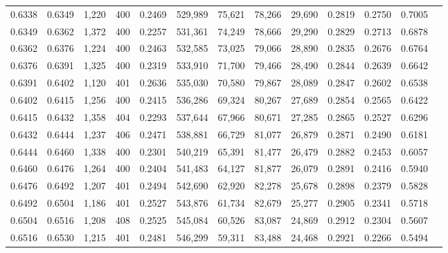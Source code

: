 \begin{tabular}{rrrrrrrrrrrrr}
0.6338 & 0.6349 &  1,220 & 400 &                                     0.2469 & 529,989 &  75,621 &  78,266 &  29,690 & 0.2819 & 0.2750 & 0.7005 \\
0.6349 & 0.6362 &  1,372 & 400 &                                     0.2257 & 531,361 &  74,249 &  78,666 &  29,290 & 0.2829 & 0.2713 & 0.6878 \\
0.6362 & 0.6376 &  1,224 & 400 &                                     0.2463 & 532,585 &  73,025 &  79,066 &  28,890 & 0.2835 & 0.2676 & 0.6764 \\
0.6376 & 0.6391 &  1,325 & 400 &                                     0.2319 & 533,910 &  71,700 &  79,466 &  28,490 & 0.2844 & 0.2639 & 0.6642 \\
0.6391 & 0.6402 &  1,120 & 401 &                                     0.2636 & 535,030 &  70,580 &  79,867 &  28,089 & 0.2847 & 0.2602 & 0.6538 \\
0.6402 & 0.6415 &  1,256 & 400 &                                     0.2415 & 536,286 &  69,324 &  80,267 &  27,689 & 0.2854 & 0.2565 & 0.6422 \\
0.6415 & 0.6432 &  1,358 & 404 &                                     0.2293 & 537,644 &  67,966 &  80,671 &  27,285 & 0.2865 & 0.2527 & 0.6296 \\
0.6432 & 0.6444 &  1,237 & 406 &                                     0.2471 & 538,881 &  66,729 &  81,077 &  26,879 & 0.2871 & 0.2490 & 0.6181 \\
0.6444 & 0.6460 &  1,338 & 400 &                                     0.2301 & 540,219 &  65,391 &  81,477 &  26,479 & 0.2882 & 0.2453 & 0.6057 \\
0.6460 & 0.6476 &  1,264 & 400 &                                     0.2404 & 541,483 &  64,127 &  81,877 &  26,079 & 0.2891 & 0.2416 & 0.5940 \\
0.6476 & 0.6492 &  1,207 & 401 &                                     0.2494 & 542,690 &  62,920 &  82,278 &  25,678 & 0.2898 & 0.2379 & 0.5828 \\
0.6492 & 0.6504 &  1,186 & 401 &                                     0.2527 & 543,876 &  61,734 &  82,679 &  25,277 & 0.2905 & 0.2341 & 0.5718 \\
0.6504 & 0.6516 &  1,208 & 408 &                                     0.2525 & 545,084 &  60,526 &  83,087 &  24,869 & 0.2912 & 0.2304 & 0.5607 \\
0.6516 & 0.6530 &  1,215 & 401 &                                     0.2481 & 546,299 &  59,311 &  83,488 &  24,468 & 0.2921 & 0.2266 & 0.5494 \\

\end{tabular}
